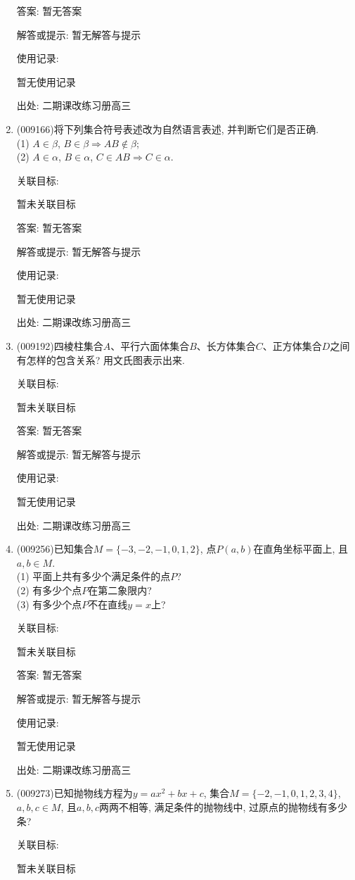 \documentclass[10pt,a4paper]{article}
\begin{document}
\begin{enumerate}[1.]
答案: 暂无答案

解答或提示: 暂无解答与提示

使用记录:

暂无使用记录


出处: 二期课改练习册高三
\item { (009166)}将下列集合符号表述改为自然语言表述, 并判断它们是否正确.\\
(1) $A\in \beta$, $B\in \beta \Rightarrow AB\not\in \beta$;\\
(2) $A\in \alpha$, $B\in \alpha$, $C\in AB\Rightarrow C\in \alpha$.


关联目标:

暂未关联目标

答案: 暂无答案

解答或提示: 暂无解答与提示

使用记录:

暂无使用记录


出处: 二期课改练习册高三
\item { (009192)}四棱柱集合$A$、平行六面体集合$B$、长方体集合$C$、正方体集合$D$之间有怎样的包含关系? 用文氏图表示出来.


关联目标:

暂未关联目标

答案: 暂无答案

解答或提示: 暂无解答与提示

使用记录:

暂无使用记录


出处: 二期课改练习册高三
\item { (009256)}已知集合$M=\{-3,-2,-1,0,1,2\}$, 点$P(a,b) $在直角坐标平面上, 且$a, b\in M$.\\
(1) 平面上共有多少个满足条件的点$P$?\\
(2) 有多少个点$P$在第二象限内?\\
(3) 有多少个点$P$不在直线$y=x$上?


关联目标:

暂未关联目标

答案: 暂无答案

解答或提示: 暂无解答与提示

使用记录:

暂无使用记录


出处: 二期课改练习册高三
\item { (009273)}已知抛物线方程为$y=ax^2+bx+c$, 集合$M=\{-2,-1,0,1,2,3,4\}$, $a,b,c\in M$, 且$a,b,c$两两不相等, 满足条件的抛物线中, 过原点的抛物线有多少条?


关联目标:

暂未关联目标


\end{enumerate}
\end{document}
